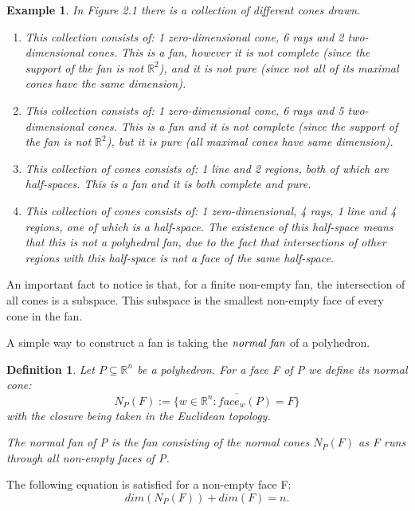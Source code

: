 \documentclass[12pt,a4paper]{report}
\newtheorem{definition}{Definition}
\newtheorem{example}{Example}
\begin{document}
\begin{example}
In Figure 2.1 there is a collection of different cones drawn. 
\begin{enumerate}[label=(\alph*)]
    \item This collection consists of: 1 zero-dimensional cone, 6 rays and 2 two-dimensional cones. This is a fan, however it is not complete (since the support of the fan is not $\mathbb{R}^{2}$), and it is not pure (since not all of its maximal cones have the same dimension).
    \item This collection consists of: 1 zero-dimensional cone, 6 rays and 5 two-dimensional cones. This is a fan and it is not complete (since the support of the fan is not $\mathbb{R}^{2}$), but it is pure (all maximal cones have same dimension).
    \item This collection of cones consists of: 1 line and 2 regions, both of which are half-spaces. This is a fan and it is both complete and pure.
    \item This collection of cones consists of: 1 zero-dimensional, 4 rays, 1 line and 4 regions, one of which is a half-space. The existence of this half-space means that this is not a polyhedral fan, due to the fact that intersections of other regions with this half-space is not a face of the same half-space.
\end{enumerate}
\end{example}

An important fact to notice is that, for a finite non-empty fan, the intersection of all cones is a subspace. This subspace is the smallest non-empty face of every cone in the fan.

A simple way to construct a fan is taking the $\emph{normal fan}$ of a polyhedron.

\begin{definition}
Let $P \subseteq \mathbb R^{n}$ be a polyhedron. For a face F of P we define its \emph{normal cone}:
\begin{equation*}
    N_{P} (F):= \overline{ \{ w \in \mathbb{R}^{n} : face_{w} (P) = F \} }
\end{equation*}
with the closure being taken in the Euclidean topology. 

The \emph{normal fan} of P is the fan consisting of the normal cones $N_P (F)$ as F runs through all non-empty faces of P.
\end{definition}

The following equation is satisfied for a non-empty face F:
\begin{equation*}
    dim(N_{P} (F)) + dim(F) = n.
\end{equation*}
\end{document}
